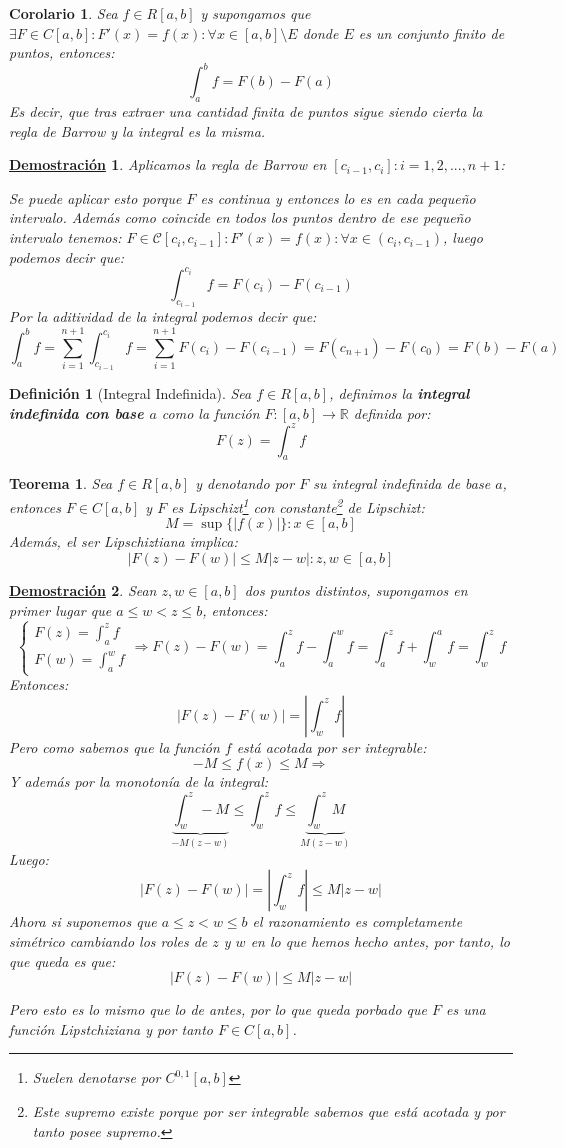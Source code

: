 \documentclass[10pt,a4paper,openright]{book}
\theoremstyle{break}
\newtheorem{defi}{Definición}[chapter]
\newtheorem{theo}{Teorema}[chapter]
\newtheorem{coro}{Corolario}[theo]
\newtheorem*{demo}{\underline{Demostración}}
\begin{document}
\begin{coro}
Sea $f\in R[a,b]$ y supongamos que $\exists F\in C[a,b]: F'(x) = f(x):\forall x\in [a,b]\setminus E$ donde $E$ es un conjunto finito de puntos, entonces:
$$\int_{a}^{b}f= F(b)- F(a)$$
Es decir, que tras extraer una cantidad finita de puntos sigue siendo cierta la regla de Barrow y la integral es la misma.
\end{coro}
\begin{demo}
Aplicamos la regla de Barrow en $[c_{i-1},c_{i}]: i = 1,2,..., n+1$:

Se puede aplicar esto porque $F$ es continua  y entonces lo es en cada pequeño intervalo. Además como coincide en todos los puntos dentro de ese pequeño intervalo tenemos: $F \in \mathcal{C}[c_i , c_{i-1}]:  F'(x)=f(x): \forall x \in (c_i , c_{i-1})$, luego podemos decir que:
$$\int_{c_{i-1}}^{c_i} f = F(c_i) - F(c_{i-1})$$
Por la aditividad de la integral podemos decir que:
$$\int_{a}^{b} f = \sum_{i=1}^{n+1} \int_{c_{i-1}}^{c_i} f = \sum_{i=1}^{n+1} F(c_i) - F(c_{i-1})= F(c_{n+1}) - F(c_0)  = F(b) - F(a)$$
\end{demo}

\begin{defi}[Integral Indefinida]
Sea $f\in R[a,b]$, definimos la \textbf{integral indefinida con base $a$} como la función $F:[a,b]\rightarrow \mathbb R$ definida por:
$$F(z)=\int_{a}^{z} f$$
\end{defi}

\begin{theo}
Sea $f\in R[a,b]$ y denotando por $F$ su integral indefinida de base $a$, entonces $F\in C[a,b]$ y $F$ es Lipschizt\footnote{Suelen denotarse por $C^{0,1}[a,b]$} con constante\footnote{Este supremo existe porque por ser integrable sabemos que está acotada y por tanto posee supremo.} de Lipschizt:
$$M=  \sup\{|f(x)|\}: x\in [a,b]$$
Además, el ser Lipschiztiana implica:
$$|F(z)-F(w)|\leq M |z-w|: z,w\in [a,b]$$
\end{theo}
\begin{demo}
Sean $z,w\in [a,b]$ dos puntos distintos, supongamos en primer lugar que $a\leq w<z\leq b$, entonces:
$$\begin{cases} F(z)= \int_{a}^{z} f \\ F(w) = \int_{a}^{w} f \end{cases}\Rightarrow F(z)-F(w) = \int_{a}^{z} f -\int_{a}^{w} f = \int_{a}^{z} f +\int_{w}^{a} f = \int_{w}^{z} f$$
Entonces:
$$|F(z)-F(w)| = \left|\int_{w}^{z} f \right|$$
Pero como sabemos que la función $f$ está acotada por ser integrable:
$$-M \leq f(x) \leq M \Rightarrow$$
Y además por la monotonía de la integral:
$$\underbrace{\int_{w}^{z} -M}_{-M(z-w)} \leq \int_{w}^{z} f\leq \underbrace{\int_{w}^{z} M}_{M(z-w)}$$
Luego:
$$|F(z)-F(w)| = \left|\int_{w}^{z} f \right| \leq M|z-w| $$
Ahora si suponemos que $a\leq z<w\leq b$ el razonamiento es completamente simétrico cambiando los roles de $z$ y $w$ en lo que hemos hecho antes, por tanto, lo que queda es que:
$$|F(z)-F(w)| \leq M|z-w| $$

Pero esto es lo mismo que lo de antes, por lo que queda porbado que $F$ es una función Lipstchiziana y por tanto $F\in C[a,b]$.
\end{demo}
\end{document}

